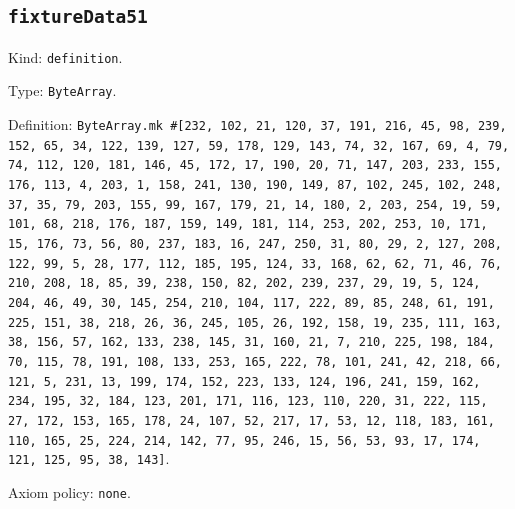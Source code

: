 \documentclass[11pt]{article}
\begin{document}
\subsection*{\texttt{fixtureData51}}
\noindent Kind: \texttt{definition}.\par
\noindent Type: \texttt{ByteArray}.\par
\noindent Definition: \texttt{ByteArray.mk \#[232, 102, 21, 120, 37, 191, 216, 45, 98, 239, 152, 65, 34, 122, 139, 127, 59, 178, 129, 143, 74, 32, 167, 69, 4, 79, 74, 112, 120, 181, 146, 45, 172, 17, 190, 20, 71, 147, 203, 233, 155, 176, 113, 4, 203, 1, 158, 241, 130, 190, 149, 87, 102, 245, 102, 248, 37, 35, 79, 203, 155, 99, 167, 179, 21, 14, 180, 2, 203, 254, 19, 59, 101, 68, 218, 176, 187, 159, 149, 181, 114, 253, 202, 253, 10, 171, 15, 176, 73, 56, 80, 237, 183, 16, 247, 250, 31, 80, 29, 2, 127, 208, 122, 99, 5, 28, 177, 112, 185, 195, 124, 33, 168, 62, 62, 71, 46, 76, 210, 208, 18, 85, 39, 238, 150, 82, 202, 239, 237, 29, 19, 5, 124, 204, 46, 49, 30, 145, 254, 210, 104, 117, 222, 89, 85, 248, 61, 191, 225, 151, 38, 218, 26, 36, 245, 105, 26, 192, 158, 19, 235, 111, 163, 38, 156, 57, 162, 133, 238, 145, 31, 160, 21, 7, 210, 225, 198, 184, 70, 115, 78, 191, 108, 133, 253, 165, 222, 78, 101, 241, 42, 218, 66, 121, 5, 231, 13, 199, 174, 152, 223, 133, 124, 196, 241, 159, 162, 234, 195, 32, 184, 123, 201, 171, 116, 123, 110, 220, 31, 222, 115, 27, 172, 153, 165, 178, 24, 107, 52, 217, 17, 53, 12, 118, 183, 161, 110, 165, 25, 224, 214, 142, 77, 95, 246, 15, 56, 53, 93, 17, 174, 121, 125, 95, 38, 143]}.\par
\noindent Axiom policy: \texttt{none}.\par
\end{document}
